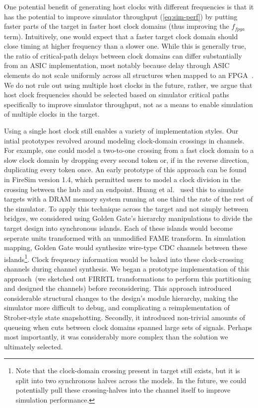 One potential benefit of generating host clocks with different frequencies is
that it has the potential to improve simulator throughput (\ref{eq:sim-perf})
by putting faster parts of the target in faster host clock domains (thus
improving the $f_{fpga}$ term). Intuitively, one would expect that a faster target clock
domain should close timing at higher frequency than a
slower one. While this is generally true, the ratio of critical-path delays
between clock domains can differ substantially from an ASIC implementation, most notably because delay through ASIC elements do
not scale uniformly across all structures when mapped to an FPGA~\cite{FPGAGap2}.
We do not rule out using multiple host clocks in the future, rather, we
argue that host clock frequencies should be selected based on simulator
critical paths specifically to improve simulator throughput, not as a means to enable
simulation of multiple clocks in the target.

Using a single host clock still enables a variety of implementation
styles. Our intial prototypes revolved around modeling clock-domain crossings
in channels. For example, one could model a two-to-one crossing from a fast clock
domain to a slow clock domain by dropping every second token or, if in the
reverse direction, duplicating every token once. An early prototype of this
approach can be found in FireSim version 1.4, which permitted users to
model a clock division in the crossing between the hub and an endpoint.
Huang et al.~\cite{centrifuge} used this to simulate targets with a DRAM memory system running
at one third the rate of the rest of the simulator. To apply this technique across
the target and not simply between bridges, we considered using Golden
Gate's hierarchy manipulations to divide the target design into synchronous
islands. Each of these islands would become seperate units transformed with an unmodified FAME transform.
In simulation mapping, Golden Gate would synthesize wire-type CDC channels between
these islands\footnote{Note that the clock-domain crossing present in target still
exists, but it is split into two synchronous halves across the models. In the future, we could
potentially pull these crossing-halves into the channel itself to improve simulation
performance.}. Clock frequency information would be baked into
these clock-crossing channels during channel synthesis. We began a prototype implementation of this
approach~(we sketched out FIRRTL transformations to perform this partitioning
and designed the channels) before reconsidering.  This approach introduced
considerable structural changes to the design's module hierarchy, making the
simulator more difficult to debug, and complicating a reimplementation of
Strober-style state snapshotting. Secondly, it introduced non-trivial
amounts of queueing when cuts between clock domains spanned large sets of signals.
Perhaps most importantly, it was considerably more complex than the solution we
ultimately selected.

